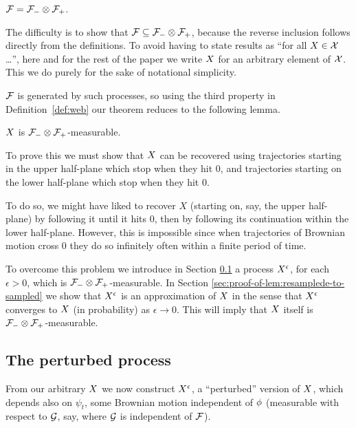{\begin{theorem}\label{thm:recoveringfromhalfplanes}
  $\mathcal{F} = \mathcal{F}_{-} \otimes \mathcal{F}_{+}$.
\end{theorem}

The difficulty is to show that $\mathcal{F} \subseteq \mathcal{F}_{-} \otimes \mathcal{F}_{+}$,
because the reverse inclusion follows directly from the definitions.
To avoid having to state results as ``for all $X \in \mathcal{X}$
\ldots'', here and for the rest of the paper we write $X$ for
an arbitrary element of $\mathcal{X}$.  This we do purely for the sake of
notational simplicity.

$\mathcal{F}$ is generated by such processes, so
using the third property in Definition~\ref{def:web}
our theorem reduces to the following lemma.

\begin{lemma}
  \label{lem:sampled-twostrip-meas}
  $X$ is $\mathcal{F}_{-} \otimes \mathcal{F}_{+}$-measurable.
\end{lemma}

To prove this we must show that $X$ can be recovered using
trajectories starting in the upper half-plane which stop when they hit
$0$, and trajectories starting on the lower half-plane which stop when
they hit $0$.

To do so, we might have liked to recover $X$ (starting on, say, the
upper half-plane) by following it until it hits 0, then by following its
continuation within the lower half-plane.  However, this is impossible
since when trajectories of Brownian motion cross $0$ they do so
infinitely often within a finite period of time.

To overcome this problem we introduce in Section
\ref{subsec:the-perturbed-process} a process $X^{\epsilon}$, for each
$\epsilon > 0$, which is $\mathcal{F}_{-} \otimes \mathcal{F}_{+}$-measurable.  In Section
\ref{sec:proof-of-lem:resamplede-to-sampled} we show that
$X^{\epsilon}$ is an approximation of $X$ in the sense that
$X^{\epsilon}$ converges to $X$ (in probability) as $\epsilon \to 0$.  This will
imply that $X$ itself is $\mathcal{F}_{-} \otimes \mathcal{F}_{+}$-measurable.

\subsection{The perturbed process}
\label{subsec:the-perturbed-process}


{
\newcommand{\joinernoargs}{\psi}
\newcommand{\joiner}[2]{\joinernoargs_{{#1}{#2}}}
\newcommand{\joinerval}[1]{\joinernoargs_{#1}}
  From our arbitrary $X$ we now construct $X^{\epsilon}$, a
  ``perturbed'' version of $X$, which depends also on
  $\joinerval{t}$,
  some Brownian motion independent of $\phi$ (measurable with
  respect to $\mathcal{G}$, say, where $\mathcal{G}$ is independent of
  $\mathcal{F}$).

}}
